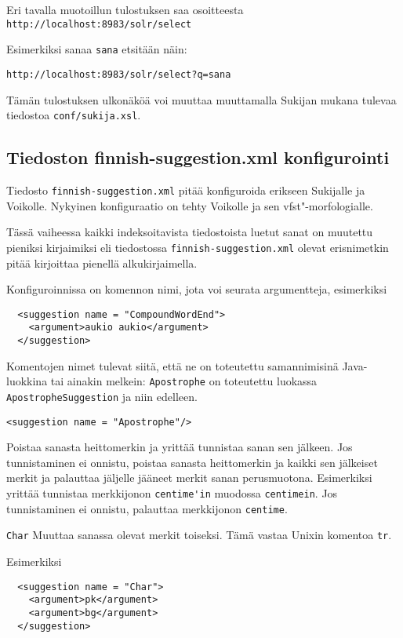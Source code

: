\documentclass[12pt,a4paper]{scrartcl}
\begin{document}
Eri tavalla muotoillun tulostuksen saa osoitteesta \\
\verb=http://localhost:8983/solr/select=

Esimerkiksi sanaa \verb=sana= etsitään näin:

\verb|http://localhost:8983/solr/select?q=sana|

Tämän tulostuksen ulkonäköä voi muuttaa muuttamalla Sukijan mukana
tulevaa tiedostoa \verb=conf/sukija.xsl=.


\subsection*{Tiedoston finnish-suggestion.xml konfigurointi}

Tiedosto \verb|finnish-suggestion.xml| pitää konfiguroida erikseen
Sukijalle ja Voikolle. Nykyinen konfiguraatio on tehty Voikolle ja sen
vfst"-morfologialle.

Tässä vaiheessa kaikki indeksoitavista tiedostoista luetut sanat on
muutettu pieniksi kirjaimiksi eli tiedostossa
\verb|finnish-suggestion.xml| olevat erisnimetkin pitää kirjoittaa
pienellä alkukirjaimella.

Konfiguroinnissa on komennon nimi, jota voi seurata argumentteja,
esimerkiksi

\begin{verbatim}
  <suggestion name = "CompoundWordEnd">
    <argument>aukio aukio</argument>
  </suggestion>
\end{verbatim}


Komentojen nimet tulevat siitä,
että ne on toteutettu samannimisinä Java-luokkina tai ainakin melkein:
\verb|Apostrophe| on toteutettu luokassa \verb|ApostropheSuggestion|
ja niin edelleen.


\bigskip
\verb|<suggestion name = "Apostrophe"/>|

Poistaa sanasta heittomerkin ja yrittää tunnistaa sanan sen jälkeen.
Jos tunnistaminen ei onnistu, poistaa sanasta heittomerkin ja kaikki
sen jälkeiset merkit ja palauttaa jäljelle jääneet merkit sanan
perusmuotona. Esimerkiksi yrittää tunnistaa merkkijonon
\verb|centime'in| muodossa \verb|centimein|. Jos tunnistaminen ei
onnistu, palauttaa merkkijonon \verb|centime|.



\bigskip
\verb|Char| Muuttaa sanassa olevat merkit toiseksi. Tämä vastaa Unixin komentoa \verb|tr|.

Esimerkiksi

\begin{verbatim}
  <suggestion name = "Char">
    <argument>pk</argument>
    <argument>bg</argument>
  </suggestion>
\end{verbatim}
\end{document}
